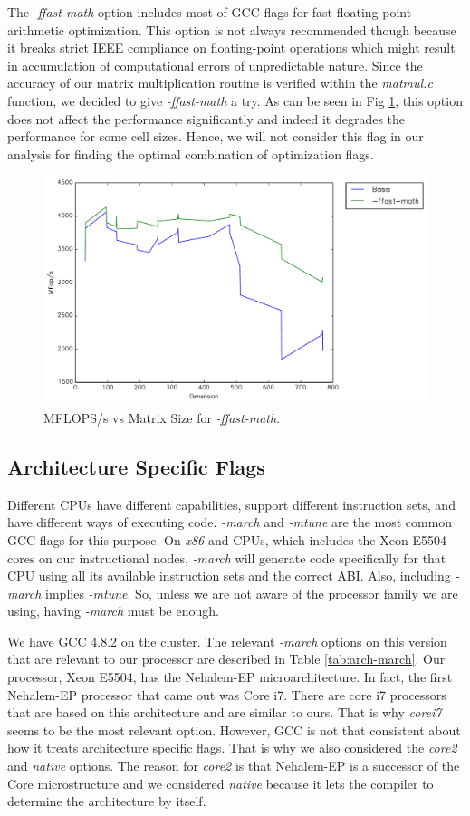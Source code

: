 \documentclass{article}
\begin{document}
The \textit{-ffast-math} option includes most of GCC flags for fast floating point arithmetic optimization.  This option is not always recommended though because it breaks strict IEEE compliance on floating-point operations which might result in accumulation of computational errors of unpredictable nature. Since the accuracy of our matrix multiplication routine is verified within the \textit{ matmul.c} function, we decided to give \textit{-ffast-math} a try. As can be seen in Fig \ref{fig:timing-math}, this option does not affect the performance significantly and indeed it degrades the performance for some cell sizes. Hence, we will not consider this flag in our analysis for finding the optimal combination of optimization flags.
 

  \begin{figure}[h]
    \centering
    \includegraphics[width=.7\textwidth]{timing-math.pdf}
    \caption{MFLOPS/s vs Matrix Size for \textit{-ffast-math}.}
    \label{fig:timing-math}
  \end{figure}

\subsection{Architecture Specific Flags}

Different CPUs have different capabilities, support different instruction sets, and have different ways of executing code. \textit{-march} and \textit{-mtune} are the most common GCC flags for this purpose. On \textit{x86} and  CPUs, which includes the Xeon E5504 cores on our instructional nodes, \textit{-march} will generate code specifically for that CPU using all its available instruction sets and the correct ABI. Also, including \textit{-march} implies \textit{-mtune}. So, unless we are not aware of the processor family we are using, having \textit{-march} must be enough. 

We have GCC 4.8.2 on the cluster. The relevant \textit{-march} options on this version that are relevant to our processor are described in Table \ref{tab:arch-march}. Our processor, Xeon E5504, has the Nehalem-EP microarchitecture.  In fact, the first Nehalem-EP processor that came out was Core i7. There are core i7 processors that are based on this architecture and are similar to ours. That is why \textit{corei7} seems to be the most relevant option. However, GCC is not that consistent about how it treats architecture specific flags. That is why we also considered the \textit{core2} and \textit{native} options. The reason for \textit{core2} is that Nehalem-EP is a successor of the Core microstructure and we considered \textit{native} because it lets the compiler to determine the architecture by itself. 
\end{document}
